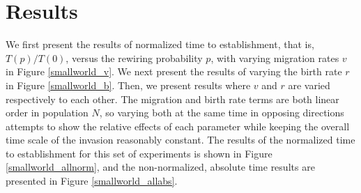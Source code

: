 \documentclass[12pt, openany]{book}
\theoremstyle{definition}
\theoremstyle{remark}
\numberwithin{equation}{chapter}
\numberwithin{figure}{chapter}
\begin{document}
\section{Results}

We first present the results of normalized time to establishment, that is, $T(p)/T(0)$, versus the rewiring probability $p$, with varying migration rates $v$ in Figure \ref{smallworld_v}. We next present the results of varying the birth rate $r$ in Figure \ref{smallworld_b}. Then, we present results where $v$ and $r$ are varied respectively to each other. The migration and birth rate terms are both linear order in population $N$, so varying both at the same time in opposing directions attempts to show the relative effects of each parameter while keeping the overall time scale of the invasion reasonably constant. The results of the normalized time to establishment for this set of experiments is shown in Figure \ref{smallworld_allnorm}, and the non-normalized, absolute time results are presented in Figure \ref{smallworld_allabs}. 
\end{document}
